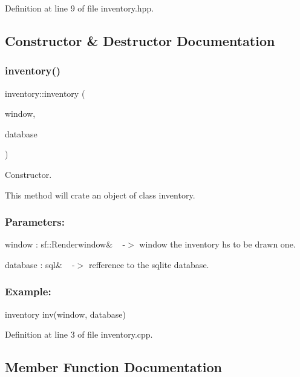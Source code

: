 Definition at line 9 of file inventory.\+hpp.



\subsection{Constructor \& Destructor Documentation}
\mbox{\label{classinventory_a0c767f0886d01023984f4b06372ca626}} 
\subsubsection{\texorpdfstring{inventory()}{inventory()}}
{\footnotesize\ttfamily inventory\+::inventory (\begin{DoxyParamCaption}\item[{sf\+::\+Render\+Window \&}]{window,  }\item[{\hyperlink{classsql}{sql} \&}]{database }\end{DoxyParamCaption})}



Constructor. 

This method will crate an object of class inventory.~\newline


\subsubsection*{Parameters\+: }

window \+: sf\+::\+Renderwindow\& ~\newline
-\/$>$ window the inventory hs to be drawn one.

database \+: sql\& ~\newline
-\/$>$ refference to the sqlite database.~\newline


\subsubsection*{Example\+: }

inventory inv(window, database)~\newline


Definition at line 3 of file inventory.\+cpp.



\subsection{Member Function Documentation}
\mbox{\label{classinventory_abb6d846e4b7297f79c2c9fb34b26fee2}} 
